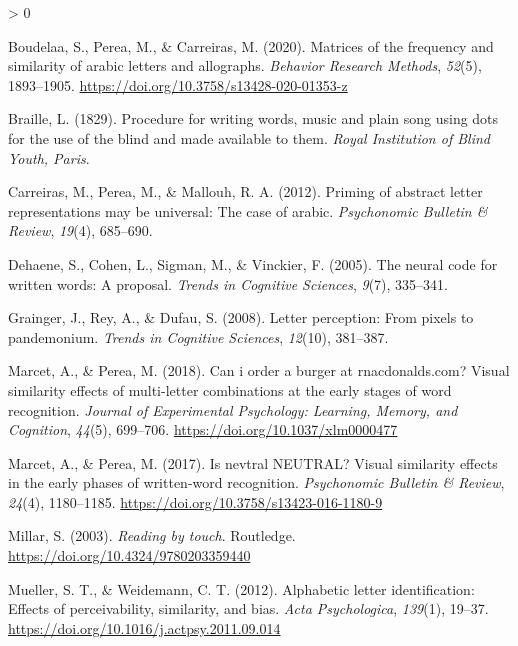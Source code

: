 \documentclass[
  english,
  man]{apa7}
\newlength{\cslhangindent}
\newenvironment{CSLReferences}[2] %
 {%
  \setlength{\parindent}{0pt}
  \ifodd #1 \everypar{\setlength{\hangindent}{\cslhangindent}}\ignorespaces\fi
  \ifnum #2 > 0
  \setlength{\parskip}{#2\baselineskip}
  \fi
 }%
 {}
\begin{document}
\begingroup
\setlength{\parindent}{-0.5in}
\setlength{\leftskip}{0.5in}

\hypertarget{refs}{}
\begin{CSLReferences}{1}{0}
\leavevmode\hypertarget{ref-Boudelaa_2020}{}%
Boudelaa, S., Perea, M., \& Carreiras, M. (2020). Matrices of the frequency and similarity of arabic letters and allographs. \emph{Behavior Research Methods}, \emph{52}(5), 1893--1905. \url{https://doi.org/10.3758/s13428-020-01353-z}

\leavevmode\hypertarget{ref-braille1829procedure}{}%
Braille, L. (1829). Procedure for writing words, music and plain song using dots for the use of the blind and made available to them. \emph{Royal Institution of Blind Youth, Paris}.

\leavevmode\hypertarget{ref-carreiras2012priming}{}%
Carreiras, M., Perea, M., \& Mallouh, R. A. (2012). Priming of abstract letter representations may be universal: The case of arabic. \emph{Psychonomic Bulletin \& Review}, \emph{19}(4), 685--690.

\leavevmode\hypertarget{ref-dehaene2005neural}{}%
Dehaene, S., Cohen, L., Sigman, M., \& Vinckier, F. (2005). The neural code for written words: A proposal. \emph{Trends in Cognitive Sciences}, \emph{9}(7), 335--341.

\leavevmode\hypertarget{ref-grainger2008letter}{}%
Grainger, J., Rey, A., \& Dufau, S. (2008). Letter perception: From pixels to pandemonium. \emph{Trends in Cognitive Sciences}, \emph{12}(10), 381--387.

\leavevmode\hypertarget{ref-Marcet_2018}{}%
Marcet, A., \& Perea, M. (2018). Can i order a burger at rnacdonalds.com? Visual similarity effects of multi-letter combinations at the early stages of word recognition. \emph{Journal of Experimental Psychology: Learning, Memory, and Cognition}, \emph{44}(5), 699--706. \url{https://doi.org/10.1037/xlm0000477}

\leavevmode\hypertarget{ref-Marcet_2017}{}%
Marcet, A., \& Perea, M. (2017). Is nevtral {NEUTRAL}? Visual similarity effects in the early phases of written-word recognition. \emph{Psychonomic Bulletin {\&} Review}, \emph{24}(4), 1180--1185. \url{https://doi.org/10.3758/s13423-016-1180-9}

\leavevmode\hypertarget{ref-Millar_2003}{}%
Millar, S. (2003). \emph{Reading by touch}. Routledge. \url{https://doi.org/10.4324/9780203359440}

\leavevmode\hypertarget{ref-Mueller_2012}{}%
Mueller, S. T., \& Weidemann, C. T. (2012). Alphabetic letter identification: Effects of perceivability, similarity, and bias. \emph{Acta Psychologica}, \emph{139}(1), 19--37. \url{https://doi.org/10.1016/j.actpsy.2011.09.014}


\end{CSLReferences}
\end{document}
